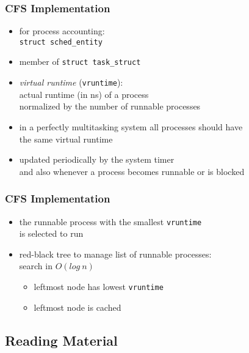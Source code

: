 \documentclass[dvipsnames]{beamer}
\begin{document}
\begin{frame}
  \frametitle{CFS Implementation}

   \begin{itemize}
    \item for process accounting:\\
      \lstinline|struct sched_entity|
    \item member of \lstinline|struct task_struct|

    \medskip
    \item \emph{virtual runtime} (\lstinline|vruntime|):\\
      actual runtime (in ns) of a process\\
      normalized by the number of runnable processes
    \item in a perfectly multitasking system all processes should have\\
      the same virtual runtime
    \item updated periodically by the system timer\\
      and also whenever a process becomes runnable or is blocked
   \end{itemize}
\end{frame}

\begin{frame}
  \frametitle{CFS Implementation}

  \begin{itemize}
    \item the runnable process with the smallest \lstinline|vruntime|\\
      is selected to run
    \item red-black tree to manage list of runnable processes:\\
      search in $O(log~n)$
    \begin{itemize}
      \item leftmost node has lowest \lstinline|vruntime|
      \item leftmost node is cached
    \end{itemize}
  \end{itemize}
\end{frame}

\subsection*{Reading Material}
\end{document}
